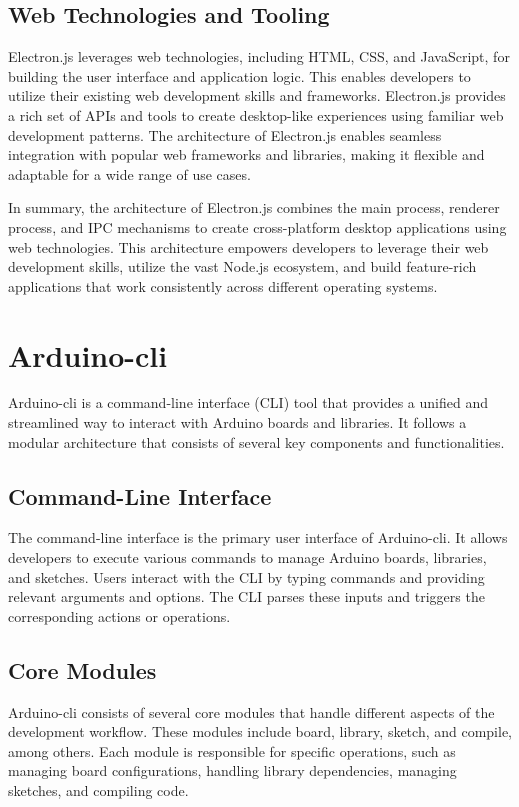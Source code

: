 \documentclass[a4paper, 11pt]{article}
\begin{document}
\subsection{Web Technologies and Tooling}
Electron.js leverages web technologies, including HTML, CSS, and JavaScript, for building the user interface and application logic. This enables developers to utilize their existing web development skills and frameworks. Electron.js provides a rich set of APIs and tools to create desktop-like experiences using familiar web development patterns. The architecture of Electron.js enables seamless integration with popular web frameworks and libraries, making it flexible and adaptable for a wide range of use cases.

\bigbreak

In summary, the architecture of Electron.js combines the main process, renderer process, and IPC mechanisms to create cross-platform desktop applications using web technologies. This architecture empowers developers to leverage their web development skills, utilize the vast Node.js ecosystem, and build feature-rich applications that work consistently across different operating systems.

\section{Arduino-cli}

Arduino-cli is a command-line interface (CLI) tool that provides a unified and streamlined way to interact with Arduino boards and libraries. It follows a modular architecture that consists of several key components and functionalities.

\subsection{Command-Line Interface}
The command-line interface is the primary user interface of Arduino-cli. It allows developers to execute various commands to manage Arduino boards, libraries, and sketches. Users interact with the CLI by typing commands and providing relevant arguments and options. The CLI parses these inputs and triggers the corresponding actions or operations.
\subsection{Core Modules}
Arduino-cli consists of several core modules that handle different aspects of the development workflow. These modules include board, library, sketch, and compile, among others. Each module is responsible for specific operations, such as managing board configurations, handling library dependencies, managing sketches, and compiling code.
\end{document}
